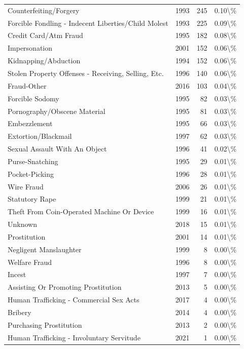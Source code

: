 \documentclass[
  12pt,
  openany]{book}
\begin{document}
\begin{longtable}[t]{lrrl}
Counterfeiting/Forgery & 1993 & 245 & 0.10\textbackslash{}\%\\
Forcible Fondling - Indecent Liberties/Child Molest & 1993 & 225 & 0.09\textbackslash{}\%\\
Credit Card/Atm Fraud & 1995 & 182 & 0.08\textbackslash{}\%\\
Impersonation & 2001 & 152 & 0.06\textbackslash{}\%\\
\addlinespace
Kidnapping/Abduction & 1994 & 152 & 0.06\textbackslash{}\%\\
Stolen Property Offenses - Receiving, Selling, Etc. & 1996 & 140 & 0.06\textbackslash{}\%\\
Fraud-Other & 2016 & 103 & 0.04\textbackslash{}\%\\
Forcible Sodomy & 1995 & 82 & 0.03\textbackslash{}\%\\
Pornography/Obscene Material & 1995 & 81 & 0.03\textbackslash{}\%\\
\addlinespace
Embezzlement & 1995 & 66 & 0.03\textbackslash{}\%\\
Extortion/Blackmail & 1997 & 62 & 0.03\textbackslash{}\%\\
Sexual Assault With An Object & 1996 & 41 & 0.02\textbackslash{}\%\\
Purse-Snatching & 1995 & 29 & 0.01\textbackslash{}\%\\
Pocket-Picking & 1996 & 28 & 0.01\textbackslash{}\%\\
\addlinespace
Wire Fraud & 2006 & 26 & 0.01\textbackslash{}\%\\
Statutory Rape & 1999 & 21 & 0.01\textbackslash{}\%\\
Theft From Coin-Operated Machine Or Device & 1999 & 16 & 0.01\textbackslash{}\%\\
Unknown & 2018 & 15 & 0.01\textbackslash{}\%\\
Prostitution & 2001 & 14 & 0.01\textbackslash{}\%\\
\addlinespace
Negligent Manslaughter & 1999 & 8 & 0.00\textbackslash{}\%\\
Welfare Fraud & 1996 & 8 & 0.00\textbackslash{}\%\\
Incest & 1997 & 7 & 0.00\textbackslash{}\%\\
Assisting Or Promoting Prostitution & 2013 & 5 & 0.00\textbackslash{}\%\\
Human Trafficking - Commercial Sex Acts & 2017 & 4 & 0.00\textbackslash{}\%\\
\addlinespace
Bribery & 2014 & 4 & 0.00\textbackslash{}\%\\
Purchasing Prostitution & 2013 & 2 & 0.00\textbackslash{}\%\\
Human Trafficking - Involuntary Servitude & 2021 & 1 & 0.00\textbackslash{}\%\\
\bottomrule
\end{longtable}
\end{document}
